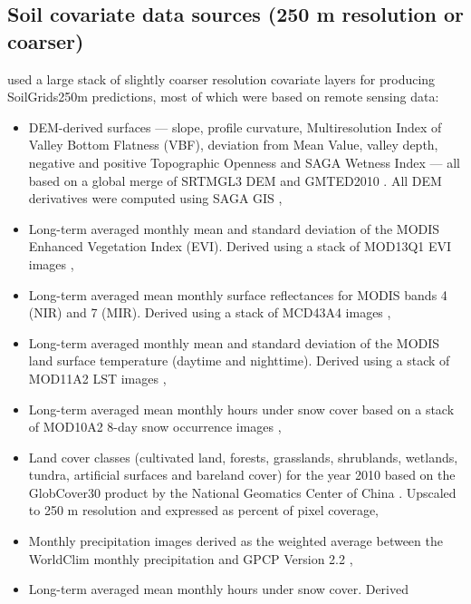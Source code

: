 \documentclass[graybox,natbib,nospthms,UStrade]{svmono}
\begin{document}
\hypertarget{soil-covs-250m}{%
\subsection{Soil covariate data sources (250 m resolution or coarser)}\label{soil-covs-250m}}

\citet{Hengl2017SoilGrids250m} used a large stack of slightly coarser resolution covariate layers for producing
SoilGrids250m predictions, most of which were based on remote sensing data:

\begin{itemize}
\item
  DEM-derived surfaces --- slope, profile curvature, Multiresolution
  Index of Valley Bottom Flatness (VBF), deviation from Mean Value,
  valley depth, negative and positive Topographic Openness and SAGA
  Wetness Index --- all based on a global merge of SRTMGL3 DEM and
  GMTED2010 \citep{Danielson2011GMTED}. All DEM derivatives were computed
  using SAGA GIS \citep{gmd-8-1991-2015},
\item
  Long-term averaged monthly mean and standard deviation of the MODIS
  Enhanced Vegetation Index (EVI). Derived using a stack of MOD13Q1
  EVI images \citep{Savtchenko2004ASR},
\item
  Long-term averaged mean monthly surface reflectances for MODIS bands
  4 (NIR) and 7 (MIR). Derived using a stack of MCD43A4 images
  \citep{mira2015modis},
\item
  Long-term averaged monthly mean and standard deviation of the MODIS
  land surface temperature (daytime and nighttime). Derived using a
  stack of MOD11A2 LST images \citep{wan2006modis},
\item
  Long-term averaged mean monthly hours under snow cover based on a
  stack of MOD10A2 8-day snow occurrence images \citep{hall2007accuracy},
\item
  Land cover classes (cultivated land, forests, grasslands,
  shrublands, wetlands, tundra, artificial surfaces and
  bareland cover) for the year 2010 based on the GlobCover30 product
  by the National Geomatics Center of China \citep{Chen2014}. Upscaled to
  250 m resolution and expressed as percent of pixel coverage,
\item
  Monthly precipitation images derived as the weighted average between
  the WorldClim monthly precipitation \citep{Hijmans2005IJC} and GPCP Version
  2.2 \citep{huffman2009gpcp},
\item
  Long-term averaged mean monthly hours under snow cover. Derived

\end{itemize}
\end{document}
